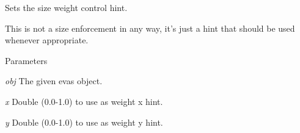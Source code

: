 Sets the size weight control hint. 

This is not a size enforcement in any way, it's just a hint that should be used whenever appropriate.


\begin{DoxyParams}{Parameters}
\item[{\em obj}]The given evas object. \item[{\em x}]Double (0.0-\/1.0) to use as weight x hint. \item[{\em y}]Double (0.0-\/1.0) to use as weight y hint. \end{DoxyParams}
